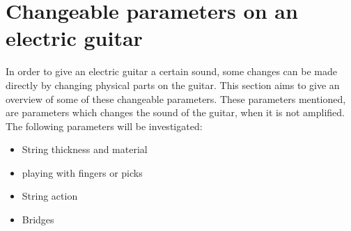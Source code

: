 \section{Changeable parameters on an electric guitar}

In order to give an electric guitar a certain sound, some changes can be made directly by changing physical parts on the guitar. This section aims to give an overview of some of these changeable parameters. These parameters mentioned, are parameters which changes the sound of the guitar, when it is not amplified. The following parameters will be investigated:

\begin{itemize}
 \item String thickness and material
 \item playing with fingers or picks
 \item String action
 \item Bridges
\end{itemize}
